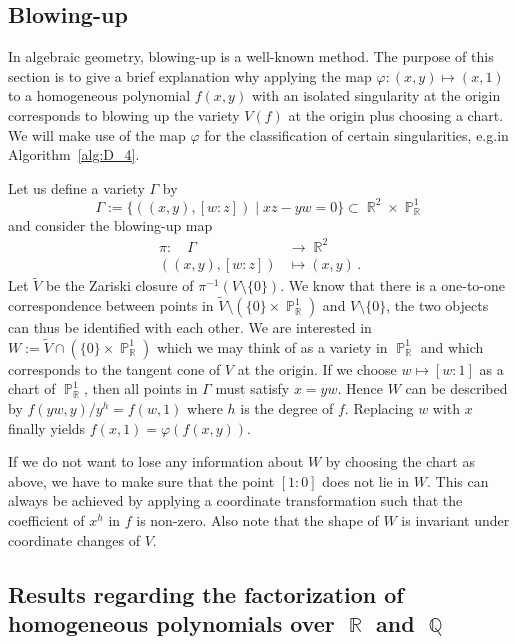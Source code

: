 \documentclass[noend]{amsproc}
\DeclareMathOperator{\Q}{\mathbb{Q}}
\DeclareMathOperator{\R}{\mathbb{R}}
\DeclareMathOperator{\Pj}{\mathbb{P}}
\begin{document}
\subsection{Blowing-up}%
\label{subsec:blowing_up}

In algebraic geometry, blowing-up is a well-known method. The purpose of this
section is to give a brief explanation why applying the map
$\varphi: (x,y) \mapsto (x,1)$ to a homogeneous polynomial $f(x,y)$ with an
isolated singularity at the origin corresponds to blowing up the variety $V(f)$
at the origin plus choosing a chart. We will make use of the map $\varphi$ for
the classification of certain singularities, e.g.\@ in Algorithm~\ref{alg:D_4}.

Let us define a variety $\Gamma$ by
\[
\Gamma := \{ ((x,y), [w:z]) \mid xz-yw = 0 \} \subset \R^2 \times \Pj_{\R}^1
\]
and consider the blowing-up map
\begin{align*}
\pi: \quad \Gamma &\rightarrow \R^2 \\
((x,y), [w:z]) &\mapsto (x,y) \,.
\end{align*}
Let $\widetilde{V}$ be the Zariski closure of $\pi^{-1}(V\setminus\{0\})$. We
know that there is a one-to-one correspondence between points in
$\widetilde{V} \setminus (\{0\} \times \Pj_{\R}^1)$ and $V\setminus\{0\}$, the
two objects can thus be identified with each other. We are interested in
$W := \widetilde{V} \cap (\{0\} \times \Pj_{\R}^1)$ which we may think of as a
variety in $\Pj_{\R}^1$ and which corresponds to the tangent cone of $V$ at the
origin. If we choose $w \mapsto [w:1]$ as a chart of $\Pj_{\R}^1$, then all
points in $\Gamma$ must satisfy $x = yw$. Hence $W$ can be described by
$f(yw,y)/y^h = f(w,1)$ where $h$ is the degree of $f$. Replacing $w$ with $x$
finally yields $f(x,1) = \varphi(f(x,y))$.

If we do not want to lose any information about $W$ by choosing the chart as
above, we have to make sure that the point $[1:0]$ does not lie in $W$. This
can always be achieved by applying a coordinate transformation such that the
coefficient of $x^h$ in $f$ is non-zero. Also note that the shape of $W$ is
invariant under coordinate changes of $V$.


\subsection{Results regarding the factorization of homogeneous polynomials
over $\R$ and $\Q$}%
\label{ResultsRegardingTheFactorizationOfHomogeneousPolynomialsOverRAndQ}%
\label{subsec:factorization}
\end{document}
